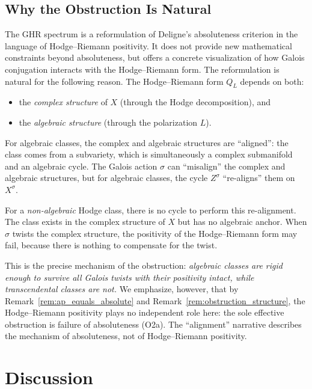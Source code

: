 \documentclass[aps,prd,twocolumn,superscriptaddress,nofootinbib]{revtex4-2}
\theoremstyle{definition}
\theoremstyle{remark}
\begin{document}
\subsection{Why the Obstruction Is Natural}

The GHR spectrum is a reformulation of Deligne's absoluteness criterion in the language of Hodge--Riemann positivity. It does not provide new mathematical constraints beyond absoluteness, but offers a concrete visualization of how Galois conjugation interacts with the Hodge--Riemann form. The reformulation is natural for the following reason. The Hodge--Riemann form $Q_L$ depends on both:
\begin{itemize}
\item the \textit{complex structure} of $X$ (through the Hodge decomposition), and
\item the \textit{algebraic structure} (through the polarization $L$).
\end{itemize}

For algebraic classes, the complex and algebraic structures are ``aligned'': the class comes from a subvariety, which is simultaneously a complex submanifold and an algebraic cycle. The Galois action $\sigma$ can ``misalign'' the complex and algebraic structures, but for algebraic classes, the cycle $Z^\sigma$ ``re-aligns'' them on $X^\sigma$.

For a \textit{non-algebraic} Hodge class, there is no cycle to perform this re-alignment. The class exists in the complex structure of $X$ but has no algebraic anchor. When $\sigma$ twists the complex structure, the positivity of the Hodge--Riemann form may fail, because there is nothing to compensate for the twist.

This is the precise mechanism of the obstruction: \textit{algebraic classes are rigid enough to survive all Galois twists with their positivity intact, while transcendental classes are not.} We emphasize, however, that by Remark~\ref{rem:ap_equals_absolute} and Remark~\ref{rem:obstruction_structure}, the Hodge--Riemann positivity plays no independent role here: the sole effective obstruction is failure of absoluteness (O2a). The ``alignment'' narrative describes the mechanism of absoluteness, not of Hodge--Riemann positivity.


\section{Discussion}
\label{sec:discussion}
\end{document}
